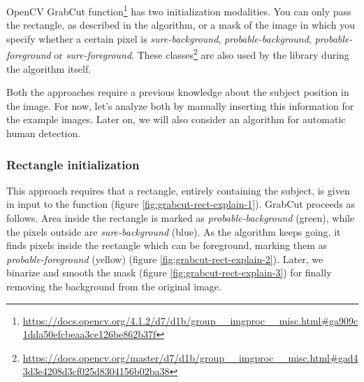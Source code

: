 OpenCV GrabCut function\footnote{\url{https://docs.opencv.org/4.1.2/d7/d1b/group__imgproc__misc.html\#ga909c1dda50efcbeaa3ce126be862b37f}} has two initialization modalities. You can only pass the rectangle, as described in the algorithm, or a mask of the image in which you specify whether a certain pixel is \textit{sure-background}, \textit{probable-background}, \textit{probable-foreground} or \textit{sure-foreground}. These classes\footnote{\url{https://docs.opencv.org/master/d7/d1b/group__imgproc__misc.html\#gad43d3e4208d3cf025d8304156b02ba38}} are also used by the library during the algorithm itself. 

\medskip

Both the approaches require a previous knowledge about the subject position in the image. For now, let’s analyze both by manually inserting this information for the example images. Later on, we will also consider an algorithm for automatic human detection.


\subsubsection{Rectangle initialization}
\label{subsec:masking-grabcut-rect}

This approach requires that a rectangle, entirely containing the subject, is given in input to the function (figure \ref{fig:grabcut-rect-explain-1}). GrabCut proceeds as follows. Area inside the rectangle is marked as \textit{probable-background} (green), while the pixels outside are \textit{sure-background} (blue). As the algorithm keeps going, it finds pixels inside the rectangle which can be foreground, marking them as \textit{probable-foreground} (yellow) (figure \ref{fig:grabcut-rect-explain-2}). Later, we binarize and smooth the mask (figure \ref{fig:grabcut-rect-explain-3}) for finally removing the background from the original image.

